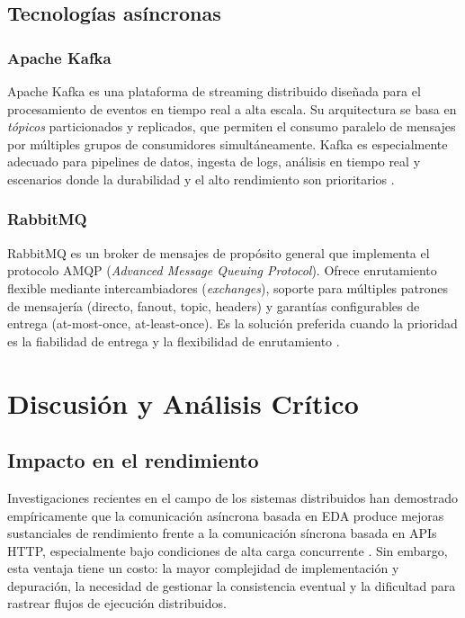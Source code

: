 \documentclass[12pt,a4paper]{article}
\begin{document}
\subsection{Tecnologías asíncronas}
 
\subsubsection{Apache Kafka}
 
Apache Kafka es una plataforma de streaming distribuido diseñada para el procesamiento de eventos en tiempo real a alta escala. Su arquitectura se basa en \textit{tópicos} particionados y replicados, que permiten el consumo paralelo de mensajes por múltiples grupos de consumidores simultáneamente. Kafka es especialmente adecuado para pipelines de datos, ingesta de logs, análisis en tiempo real y escenarios donde la durabilidad y el alto rendimiento son prioritarios \cite{ref19}.
 
\subsubsection{RabbitMQ}
 
RabbitMQ es un broker de mensajes de propósito general que implementa el protocolo AMQP (\textit{Advanced Message Queuing Protocol}). Ofrece enrutamiento flexible mediante intercambiadores (\textit{exchanges}), soporte para múltiples patrones de mensajería (directo, fanout, topic, headers) y garantías configurables de entrega (at-most-once, at-least-once). Es la solución preferida cuando la prioridad es la fiabilidad de entrega y la flexibilidad de enrutamiento \cite{ref20}.
 
\section{Discusión y Análisis Crítico}
 
\subsection{Impacto en el rendimiento}
 
Investigaciones recientes en el campo de los sistemas distribuidos han demostrado empíricamente que la comunicación asíncrona basada en EDA produce mejoras sustanciales de rendimiento frente a la comunicación síncrona basada en APIs HTTP, especialmente bajo condiciones de alta carga concurrente \cite{ref21}. Sin embargo, esta ventaja tiene un costo: la mayor complejidad de implementación y depuración, la necesidad de gestionar la consistencia eventual y la dificultad para rastrear flujos de ejecución distribuidos.
 
\end{document}
